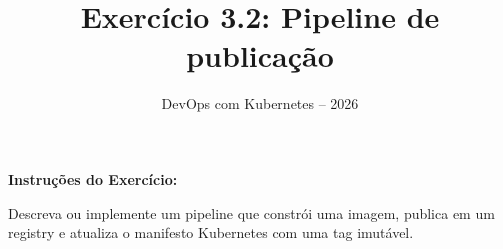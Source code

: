 \documentclass[11pt,a4paper]{article}
\title{\color{secondary}\Huge\textbf{Exercício 3.2: Pipeline de publicação}}
\author{\color{primary}DevOps com Kubernetes -- 2026}
\date{}
\begin{document}
\maketitle


\textbf{Instruções do Exercício:}

\begin{tcolorbox}[colback=blue!5!white,colframe=blue!75!black]
Descreva ou implemente um pipeline que constrói uma imagem, publica em um registry e atualiza o manifesto Kubernetes com uma tag imutável.
\end{tcolorbox}
\end{document}
